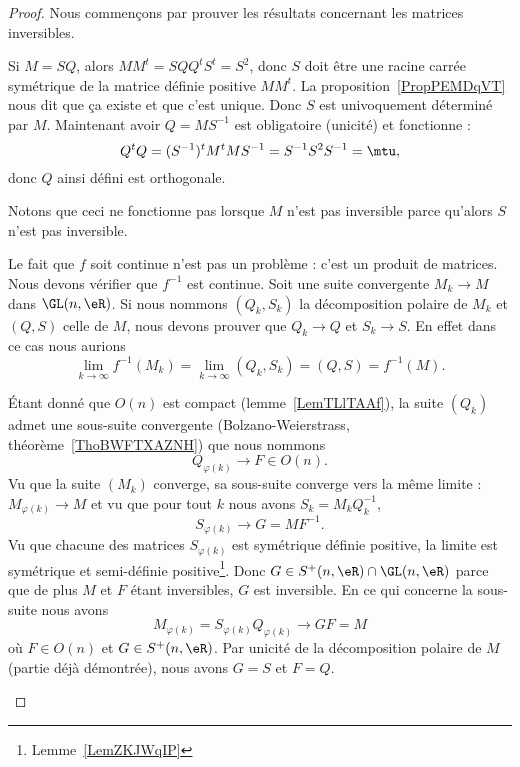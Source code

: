 \begin{proof}
	Nous commençons par prouver les résultats concernant les matrices inversibles.
	\begin{subproof}

		Si \( M=SQ\), alors \( MM^t=SQQ^tS^t=S^2\), donc \( S\) doit être une racine carrée symétrique de la matrice définie positive \( MM^t\). La proposition~\ref{PropPEMDqVT} nous dit que ça existe et que c'est unique. Donc \( S\) est univoquement déterminé par \( M\). Maintenant avoir \( Q=MS^{-1}\) est obligatoire (unicité) et fonctionne :
		\begin{equation}
			Q^tQ=(S^{-1})^tM^tMS^{-1}=S^{-1}S^2S^{-1}=\mtu,
		\end{equation}
		donc \( Q\) ainsi défini est orthogonale.

		Notons que ceci ne fonctionne pas lorsque \( M\) n'est pas inversible parce qu'alors \( S\) n'est pas inversible.

		\spitem[Homéomorphisme]

		Le fait que \( f\) soit continue n'est pas un problème : c'est un produit de matrices. Nous devons vérifier que \( f^{-1}\) est continue. Soit une suite convergente \( M_k\to M\) dans \( \GL(n,\eR)\). Si nous nommons \( (Q_k,S_k)\) la décomposition polaire de \( M_k\) et \( (Q,S)\) celle de \( M\), nous devons prouver que \( Q_k\to Q\) et \( S_k\to S\). En effet dans ce cas nous aurions
		\begin{equation}    \label{EqJIkoaJv}
			\lim_{k\to \infty} f^{-1}(M_k)=\lim_{k\to \infty} (Q_k,S_k)=(Q,S)=f^{-1}(M).
		\end{equation}

		Étant donné que \( O(n)\) est compact (lemme~\ref{LemTLlTAAf}), la suite \( (Q_k)\) admet une sous-suite convergente (Bolzano-Weierstrass, théorème~\ref{ThoBWFTXAZNH}) que nous nommons
		\begin{equation}
			Q_{\varphi(k)}\to F\in O(n).
		\end{equation}
		Vu que la suite \( (M_k)\) converge, sa sous-suite converge vers la même limite : \( M_{\varphi(k)}\to M\) et vu que pour tout \( k\) nous avons \( S_k=M_kQ_k^{-1}\),
		\begin{equation}
			S_{\varphi(k)}\to G=MF^{-1}.
		\end{equation}
		Vu que chacune des matrices \( S_{\varphi(k)}\) est symétrique définie positive, la limite est symétrique et semi-définie positive\footnote{Lemme~\ref{LemZKJWqIP}}. Donc \( G\in S^+(n,\eR)\cap \GL(n,\eR)\) parce que de plus \( M\) et \( F\) étant inversibles, \( G\) est inversible. En ce qui concerne la sous-suite nous avons
		\begin{equation}
			M_{\varphi(k)}=S_{\varphi(k)}Q_{\varphi(k)}\to GF=M
		\end{equation}
		où \( F\in O(n)\) et \( G\in S^+(n,\eR)\). Par unicité de la décomposition polaire de \( M\) (partie déjà démontrée), nous avons \( G=S\) et \( F=Q\).


\end{subproof}
\end{proof}
